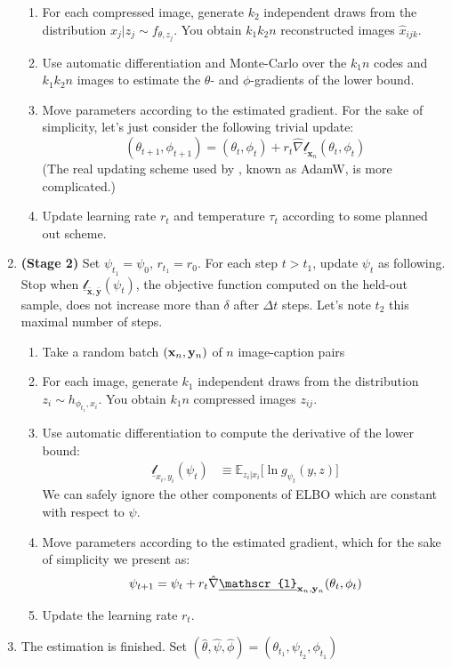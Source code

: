 \documentclass{article}
\begin{document}
\begin{appendix}
\begin{multicols}{2}
\begin{enumerate}
\begin{enumerate}
    \item For each compressed image, generate $k_2$ independent draws from the distribution $x_j|z_j\sim f_{\theta,z_j}$. You obtain $k_1k_2n$ reconstructed images $\hat x_{ijk}$.
    \item Use automatic differentiation and Monte-Carlo over the $k_1n$ codes and $k_1k_2n$ images to estimate the $\theta$- and $\phi$-gradients of the lower bound.
    \item Move parameters according to the estimated gradient. For the sake of simplicity, let's just consider the following trivial update: $$(\theta_{t+1},\phi_{t+1})=(\theta_{t},\phi_{t})+r_t\hat{\nabla}\underline{\mathscr{l}}_{\mathbf{x}_n}(\theta_{t},\phi_{t})$$
    (The real updating scheme used by \citeauthor{zeroshot}, known as AdamW, is more complicated.)
    \item Update learning rate $r_t$ and temperature $\tau_t$ according to some planned out scheme.
    \end{enumerate}
    
    \item \textbf{(Stage 2)} Set $\psi_{t_1}=\psi_0$, $r_{t_1}=r_0$. For each step $t>t_{1}$, update $\psi_t$ as following. Stop when $\underline{\mathscr{l}}_{\bar{\mathbf{x}},\bar{\mathbf{y}}}(\psi_t)$, the objective function computed on the held-out sample, does not increase more than $\delta$ after $\Delta t$ steps.  Let's note $t_2$ this maximal number of steps.
    
    \begin{enumerate}
    \item Take a random batch $(\mathbf{x}_n,\mathbf{y}_n)$ of $n$ image-caption pairs
    \item For each image, generate $k_1$ independent draws from the distribution $z_i\sim h_{\phi_{t_1},x_i}$. You obtain $k_1n$ compressed images $z_{ij}$.
    \item Use automatic differentiation to compute the derivative of the lower bound: \begin{align*}
    \underline{\mathscr{l}}_{x_i,y_i}(\psi_t) & \equiv \mathbb{E}_{z_i|x_i} \Big[\ln g_{\psi_t}(y,z)\Big]
    \end{align*}
    We can safely ignore the other components of ELBO which are constant with respect to $\psi$.
    \item Move parameters according to the estimated gradient, which for the sake of simplicity we present as: $$\psi_{t+1}=\psi_{t}+r_t\hat{\nabla}\underline{\mathscr{l}}_{\xn,\yn}(\theta_{t},\phi_{t})$$
    \item Update the learning rate $r_t$.
    \end{enumerate}
    \item The estimation is finished. Set $(\hat \theta, \hat \psi, \hat \phi)=(\theta_{t_1}, \psi_{t_2}, \phi_{t_1})$
\end{enumerate}


\end{multicols}
\end{appendix}
\end{document}

